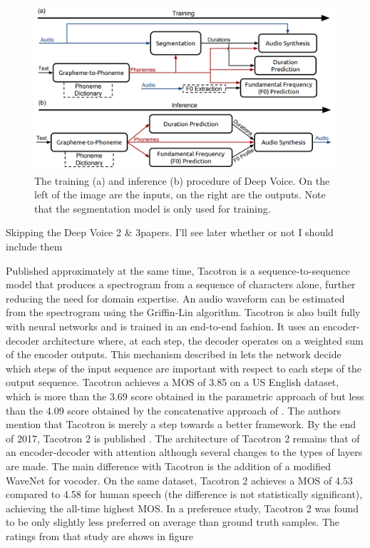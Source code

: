 \documentclass[a4paper, oneside]{article}
\begin{document}
\begin{figure}[h]
	\centering
	\includegraphics[width=.8\linewidth]{images/deep_voice_1_arch.png}
	\caption{The training (a) and inference (b) procedure of Deep Voice. On the left of the image are the inputs, on the right are the outputs. Note that the segmentation model is only used for training.}
	\label{deep_voice_1_arch}
\end{figure}


\color{red}
Skipping the Deep Voice 2 \& 3papers. I'll see later whether or not I should include them
\color{black}

Published approximately at the same time, Tacotron \citep{Tacotron1} is a sequence-to-sequence model that produces a spectrogram from a sequence of characters alone, further reducing the need for domain expertise. An audio waveform can be estimated from the spectrogram using the Griffin-Lin algorithm. Tacotron is also built fully with neural networks and is trained in an end-to-end fashion. It uses an encoder-decoder architecture where, at each step, the decoder operates on a weighted sum of the encoder outputs. This mechanism described in \citep{Attention} lets the network decide which steps of the input sequence are important with respect to each steps of the output sequence. Tacotron achieves a MOS of 3.85 on a US English dataset, which is more than the 3.69 score obtained in the parametric approach of \citep{LSTM-RNN} but less than the 4.09 score obtained by the concatenative approach of \citep{ConcatenativeGoogle}. The authors mention that Tacotron is merely a step towards a better framework. By the end of 2017, Tacotron 2 is published \citep{Tacotron2}. The architecture of Tacotron 2 remains that of an encoder-decoder with attention although several changes to the types of layers are made. The main difference with Tacotron is the addition of a modified WaveNet for vocoder. On the same dataset, Tacotron 2 achieves a MOS of 4.53 compared to 4.58 for human speech (the difference is not statistically significant), achieving the all-time highest MOS. In a preference study, Tacotron 2 was found to be only slightly less preferred on average than ground truth samples. The ratings from that study are shows in figure 
\end{document}
